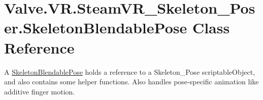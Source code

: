 \hypertarget{class_valve_1_1_v_r_1_1_steam_v_r___skeleton___poser_1_1_skeleton_blendable_pose}{}\section{Valve.\+V\+R.\+Steam\+V\+R\+\_\+\+Skeleton\+\_\+\+Poser.\+Skeleton\+Blendable\+Pose Class Reference}
\label{class_valve_1_1_v_r_1_1_steam_v_r___skeleton___poser_1_1_skeleton_blendable_pose}


A \mbox{\hyperlink{class_valve_1_1_v_r_1_1_steam_v_r___skeleton___poser_1_1_skeleton_blendable_pose}{Skeleton\+Blendable\+Pose}} holds a reference to a Skeleton\+\_\+\+Pose scriptable\+Object, and also contains some helper functions. Also handles pose-\/specific animation like additive finger motion.  



